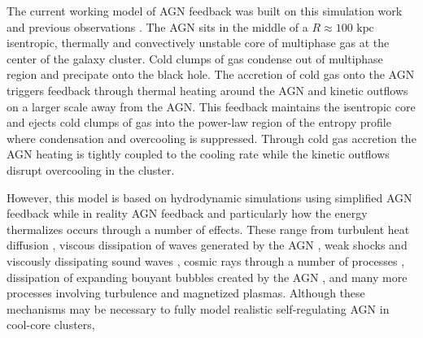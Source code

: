 \documentclass[iop,apjl, twocolappendix]{emulateapj}   %
\begin{document}
The current working model of AGN feedback was built on this simulation work and
previous observations
\cite{voit_global_2017,gaspari_raining_2017,gaspari_unifying_2017}. The AGN
sits in the middle of a $R \approx 100 \text{ kpc}$ isentropic, thermally and
convectively unstable core of multiphase gas at the center of the galaxy
cluster. Cold clumps of gas condense out of multiphase region and precipate
onto the black hole. The accretion of cold gas onto the AGN triggers feedback
through thermal heating around the AGN and kinetic outflows on a larger scale
away from the AGN. This feedback maintains the isentropic core and ejects cold
clumps of gas into the power-law region of the entropy profile where
condensation and overcooling is suppressed. Through cold gas accretion the AGN
heating is tightly coupled to the cooling rate while the kinetic outflows
disrupt overcooling in the cluster.

However, this model is based on hydrodynamic simulations using simplified AGN
feedback while in reality AGN feedback and particularly how the energy
thermalizes occurs through a number of effects.
These range from 
turbulent heat diffusion \cite{ruszkowski_galaxy_2011},
viscous dissipation of waves generated by the AGN \cite{ruszkowski_cluster_2004},
weak shocks and viscously dissipating sound waves \cite{fabian_deep_2003},
cosmic rays through a number of processes \cite{guo_feedback_2008,ruszkowski_global_2017},
dissipation of expanding bouyant bubbles created by the AGN \cite{churazov_evolution_2001-2},
and many more  processes involving turbulence and magnetized plasmas. Although
these mechanisms may be necessary to fully model realistic self-regulating AGN
in cool-core clusters,

\end{document}
